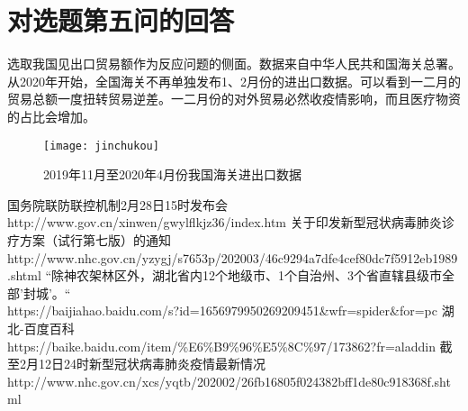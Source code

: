 \documentclass[withoutpreface,bwprint]{cumcmthesis} %
\begin{document}
\section{对选题第五问的回答}
选取我国见出口贸易额作为反应问题的侧面。数据来自中华人民共和国海关总署。从2020年开始，全国海关不再单独发布1、2月份的进出口数据。可以看到一二月的贸易总额一度扭转贸易逆差。一二月份的对外贸易必然收疫情影响，而且医疗物资的占比会增加。
    \begin{figure}[!h]
        \centering
        \texttt{[image: jinchukou]}
        \caption{2019年11月至2020年4月份我国海关进出口数据}
        \label{fig:ana2_flow}
    \end{figure}
    
\newpage
\newpage
\begin{thebibliography}{9}%
    国务院联防联控机制2月28日15时发布会 \\
    http://www.gov.cn/xinwen/gwylflkjz36/index.htm
    关于印发新型冠状病毒肺炎诊疗方案（试行第七版）的通知\\
    http://www.nhc.gov.cn/yzygj/s7653p/202003/46c9294a7dfe4cef80dc7f5912eb1989.shtml
    “除神农架林区外，湖北省内12个地级市、1个自治州、3个省直辖县级市全部'封城'。“\\
    https://baijiahao.baidu.com/s?id=1656979950269209451\&wfr=spider\&for=pc
    湖北-百度百科\\
    https://baike.baidu.com/item/\%E6\%B9\%96\%E5\%8C\%97/173862?fr=aladdin
    截至2月12日24时新型冠状病毒肺炎疫情最新情况\\
    http://www.nhc.gov.cn/xcs/yqtb/202002/26fb16805f024382bff1de80c918368f.shtml

\end{thebibliography}
\newpage
\end{document}
